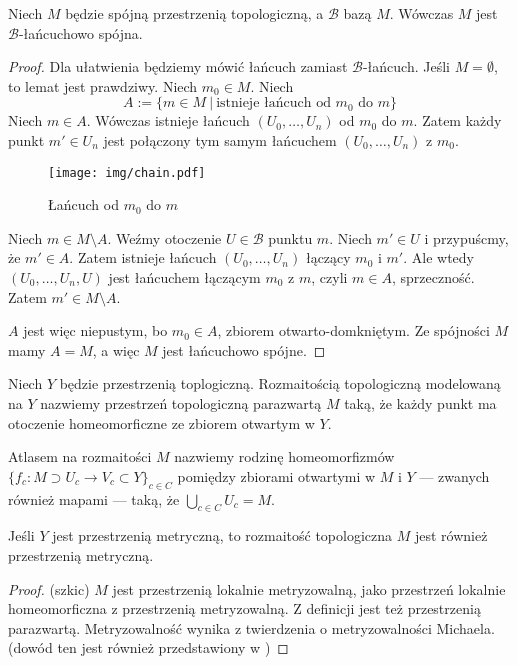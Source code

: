 \begin{lem} \label{lem:chain-connected}
  Niech $M$ będzie spójną przestrzenią topologiczną, a $\mathcal B$ bazą $M$. Wówczas $M$ jest $\mathcal B$-łańcuchowo spójna.
  \begin{proof}
    Dla ułatwienia będziemy mówić łańcuch zamiast $\mathcal B$-łańcuch.
    Jeśli $M = \emptyset$, to lemat jest prawdziwy. Niech $m_0 \in M$. Niech
    \[
      A := \{m \in M\ |\ \mbox{istnieje łańcuch od $m_0$ do $m$}\}
    \]
    Niech $m \in A$.
    Wówczas istnieje łańcuch $(U_0, \ldots, U_n)$ od $m_0$ do $m$.
    Zatem każdy punkt $m' \in U_n$ jest połączony tym samym łańcuchem $(U_0, \ldots, U_n)$ z $m_0$.
    
    \begin{figure}[h!]
      \centering
      \texttt{[image: img/chain.pdf]}
      \caption{Łańcuch od $m_0$ do $m$}
    \end{figure}
    
    Niech $m \in M\setminus A$.
    Weźmy otoczenie $U\in\mathcal B$ punktu $m$. Niech $m'\in U$ i przypuścmy, że $m'\in A$. Zatem istnieje łańcuch $(U_0, \ldots, U_n)$ łączący $m_0$ i $m'$. Ale wtedy $(U_0, \ldots, U_n, U)$ jest łańcuchem łączącym $m_0$ z $m$, czyli $m\in A$, sprzeczność. Zatem $m'\in M\setminus A$.
    
    $A$ jest więc niepustym, bo $m_0 \in A$, zbiorem otwarto-domkniętym. Ze spójności $M$ mamy $A = M$, a więc $M$ jest łańcuchowo spójne.
  \end{proof}
\end{lem}
 
\begin{df}
  Niech $Y$ będzie przestrzenią toplogiczną. Rozmaitością topologiczną modelowaną na $Y$ nazwiemy przestrzeń topologiczną parazwartą $M$ taką, że każdy punkt ma otoczenie homeomorficzne ze zbiorem otwartym w $Y$.
\end{df}
 
\begin{df}
  Atlasem na rozmaitości $M$ nazwiemy rodzinę homeomorfizmów $\{f_c : M \supset U_c \to V_c \subset Y\}_{c \in C}$ pomiędzy zbiorami otwartymi w $M$ i $Y$ --- zwanych również mapami --- taką, że $\bigcup_{c \in C} U_c = M$.
\end{df}
 
\begin{fact} \label{fact:local-metrizability}
  Jeśli $Y$ jest przestrzenią metryczną, to rozmaitość topologiczna $M$ jest również przestrzenią metryczną.
  \begin{proof}(szkic)
    $M$ jest przestrzenią lokalnie metryzowalną, jako przestrzeń lokalnie homeomorficzna z przestrzenią metryzowalną. Z definicji jest też przestrzenią parazwartą. Metryzowalność wynika z twierdzenia o metryzowalności Michaela. \cite{mic} (dowód ten jest również przedstawiony w \cite{bp})
  \end{proof}
\end{fact}
 
